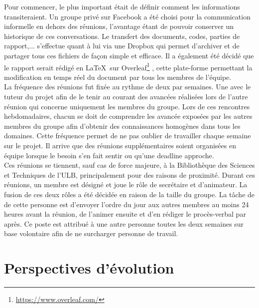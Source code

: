 \documentclass[11pt,a4paper,11pt]{report}
\begin{document}
	Pour commencer, le plus important était de définir comment les informations transiteraient. Un groupe privé sur Facebook a été choisi pour la communication informelle en dehors des réunions, l’avantage étant de pouvoir conserver un historique de ces conversations. Le transfert des documents, codes, parties de rapport,... s’effectue quant à lui via une Dropbox qui permet d'archiver et de partager tous ces fichiers de façon simple et efficace. Il a également été décidé que le rapport serait rédigé en \LaTeX ~sur \og Overleaf\footnote{\url{https://www.overleaf.com/}} \fg, cette plate-forme permettant la modification en temps réel du document par tous les membres de l’équipe.\\

	La fréquence des réunions fut fixée au rythme de deux par semaines. Une avec le tuteur du projet afin de le tenir au courant des avancées réalisées lors de l’autre réunion qui concerne uniquement les membres du groupe. Lors de ces rencontres hebdomadaires, chacun se doit de comprendre les avancée exposées par les autres membres du groupe afin d’obtenir des connaissances homogènes dans tous les domaines. Cette fréquence permet de ne pas oublier de travailler chaque semaine sur le projet. Il arrive que des réunions supplémentaires soient organisées en équipe lorsque le besoin s’en fait sentir ou qu’une deadline approche.\\

	Ces réunions se tiennent, sauf cas de force majeure, à la Bibliothèque des Sciences et Techniques de l’ULB, principalement pour des raisons de proximité. Durant ces réunions, un membre est désigné et joue le rôle de secrétaire et d’animateur. La fusion de ces deux rôles a été décidée en raison de la taille du groupe. La tâche de de cette personne est d’envoyer l’ordre du jour aux autres membres au moins 24 heures avant la réunion, de l’animer ensuite et d’en rédiger le procès-verbal par après. Ce poste est attribué à une autre personne toutes les deux semaines sur base volontaire afin de ne surcharger personne de travail.\\
    
\newpage


\chapter{Perspectives d'évolution}
\end{document}
